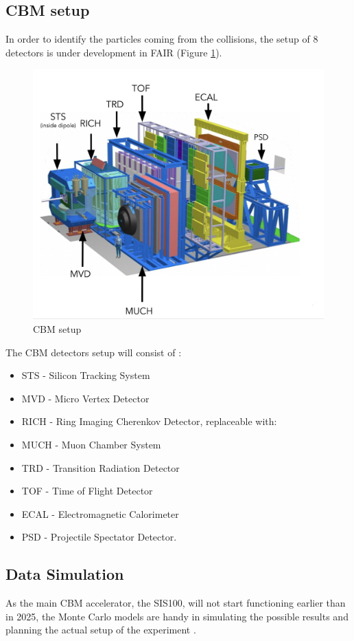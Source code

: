 \subsection{CBM setup}
In order to identify the particles coming from the collisions, the setup of 8 detectors is under development in FAIR (Figure \ref{cbm_setup}).
\begin{figure}[H]
    \centering
    \includegraphics[width=.7\textwidth]{img/cbm_setup.png}
    \caption{CBM setup \cite{progress report}}
    \label{cbm_setup}
\end{figure}
The CBM detectors setup will consist of \cite{progress report}:
\begin{itemize}
    \item STS - Silicon Tracking System
    \item MVD - Micro Vertex Detector
    \item RICH - Ring Imaging Cherenkov Detector, replaceable with:
    \item MUCH - Muon Chamber System
    \item TRD - Transition Radiation Detector
    \item TOF - Time of Flight Detector
    \item ECAL - Electromagnetic Calorimeter
    \item PSD - Projectile Spectator Detector.
\end{itemize}

\subsection{Data Simulation}
As the main CBM accelerator, the SIS100, will not start functioning earlier than in 2025, the Monte Carlo models are handy in simulating the possible results and planning the actual setup of the experiment \cite{progress report}.

